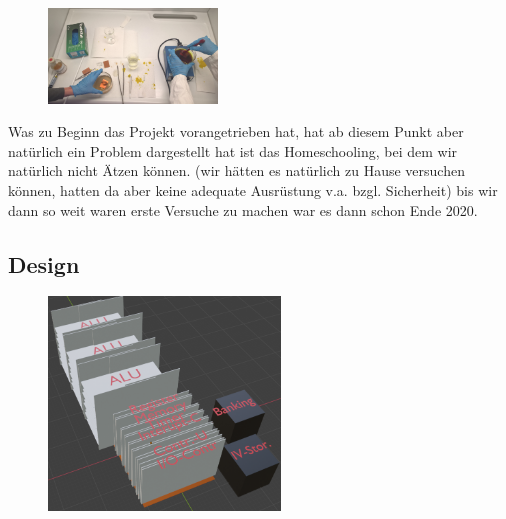 \documentclass{scrartcl}
\begin{document}
        \begin{figure}
        \vspace{-25pt}
        \begin{center}
        \includegraphics[width=0.4\textwidth,angle=0]{Handy/WP_20210704_20_40_03_Pro} %
        \end{center}
        \vspace{-20pt}
        \end{figure}

    Was zu Beginn das Projekt vorangetrieben hat, hat ab diesem Punkt aber natürlich ein Problem dargestellt hat ist das Homeschooling, bei dem wir natürlich nicht Ätzen können.
    (wir hätten es natürlich zu Hause versuchen können, hatten da aber keine adequate Ausrüstung v.a. bzgl. Sicherheit)
    bis wir dann so weit waren erste Versuche zu machen war es dann schon Ende 2020.

    \subsection{Design}

        \begin{figure}
        \vspace{-40pt}
        \begin{center}
        \includegraphics[width=0.55\textwidth]{3D_desighn_V21}
        \end{center}
        \vspace{-30pt}
        \end{figure}
\end{document}
